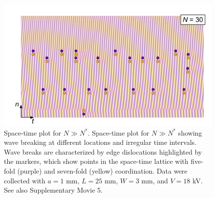 \begin{appendices}
\begin{figure}[p] 
    \centering
    \includegraphics{figures/A2_SI4.pdf}
    \caption{Space-time plot for $N\gg N^*$. Space-time plot for  $N\gg N^*$ showing wave breaking at different locations and irregular time intervals. Wave breaks are characterized by edge dislocations highlighted by the markers, which show points in the space-time lattice with five-fold (purple) and seven-fold (yellow) coordination. Data were collected with $a=1$ mm, $L=25$ mm, $W=3$ mm, and $V=18$ kV. See also Supplementary Movie 5.}
    \label{fig:SI4}
\end{figure}


\end{appendices}
